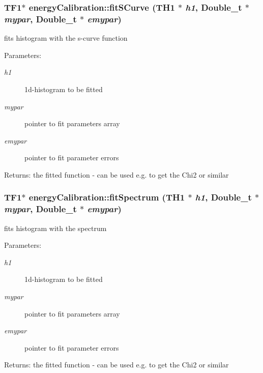 \subsubsection{\setlength{\rightskip}{0pt plus 5cm}TF1$\ast$ energy\-Calibration::fit\-SCurve (TH1 $\ast$ {\em h1}, Double\_\-t $\ast$ {\em mypar}, Double\_\-t $\ast$ {\em emypar})}\label{classenergyCalibration_0dcd8e06e31f7b70488a012db12b2bf8}


fits histogram with the s-curve function \begin{Desc}
\item[Parameters:]
\begin{description}
\item[{\em h1}]1d-histogram to be fitted \item[{\em mypar}]pointer to fit parameters array \item[{\em emypar}]pointer to fit parameter errors \end{description}
\end{Desc}
\begin{Desc}
\item[Returns:]the fitted function - can be used e.g. to get the Chi2 or similar \end{Desc}
\subsubsection{\setlength{\rightskip}{0pt plus 5cm}TF1$\ast$ energy\-Calibration::fit\-Spectrum (TH1 $\ast$ {\em h1}, Double\_\-t $\ast$ {\em mypar}, Double\_\-t $\ast$ {\em emypar})}\label{classenergyCalibration_7d22b28cd2fad3d334f15f3d6dc7975a}


fits histogram with the spectrum \begin{Desc}
\item[Parameters:]
\begin{description}
\item[{\em h1}]1d-histogram to be fitted \item[{\em mypar}]pointer to fit parameters array \item[{\em emypar}]pointer to fit parameter errors \end{description}
\end{Desc}
\begin{Desc}
\item[Returns:]the fitted function - can be used e.g. to get the Chi2 or similar \end{Desc}

